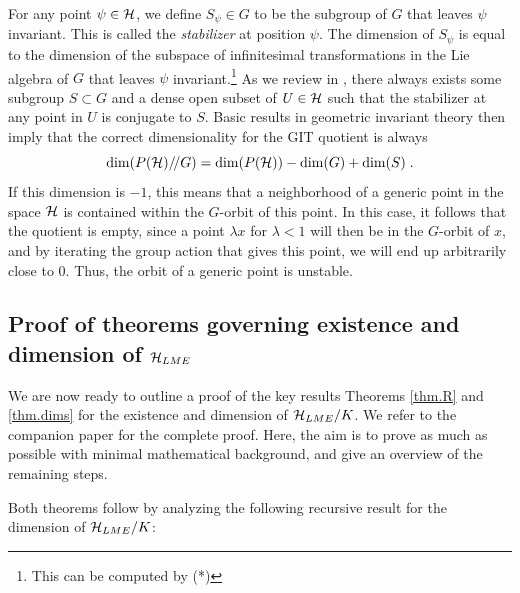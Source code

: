 \documentclass[12pt]{article}
\theoremstyle{definition}
\newcommand{\be}{\begin{equation}}
\newcommand{\ee}{\end{equation}}
\newcommand{\GITquot}{/\!/}
\begin{document}
For any point $\psi \in {\cal H}$, we define $S_\psi \in G$ to be the subgroup of $G$ that leaves $\psi$ invariant. This is called the {\it stabilizer} at position $\psi$. The dimension of $S_\psi$ is equal to the dimension of the subspace of infinitesimal transformations in the Lie algebra of $G$ that leaves $\psi$ invariant.\footnote{This can be computed by (*)} As we review in \cite{mathpaper}, there always exists some subgroup $S \subset G$ and a dense open subset of $U \in {\cal H}$ such that the stabilizer at any point in $U$ is conjugate to $S$. Basic results in geometric invariant theory then imply that the correct dimensionality for the GIT quotient is always
\be
\label{realdim}
{\rm dim}(P({\cal H})\GITquot G) = {\rm dim}(P({\cal H})) - {\rm dim}(G) + {\rm dim}(S)    \; .
\ee
If this dimension is $-1$, this means that a neighborhood of a generic point in the space ${\cal H}$ is contained within the $G$-orbit of this point. In this case, it follows that the quotient is empty, since a point $\lambda x$ for $\lambda < 1$ will then be in the $G$-orbit of $x$, and by iterating the group action that gives this point, we will end up arbitrarily close to 0. Thus, the orbit of a generic point is unstable.

\subsection{Proof of theorems governing existence and dimension of ${\cal H}_{LME}$}

We are now ready to outline a proof of the key results Theorems \ref{thm.R} and \ref{thm.dims} for the existence and dimension of ${\cal H}_{LME}/K$. We refer to the companion paper \cite{mathpaper} for the complete proof. Here, the aim is to prove as much as possible with minimal mathematical background, and give an overview of the remaining steps.

Both theorems follow by analyzing the following recursive result for the dimension of ${\cal H}_{LME}/K$:
\end{document}
